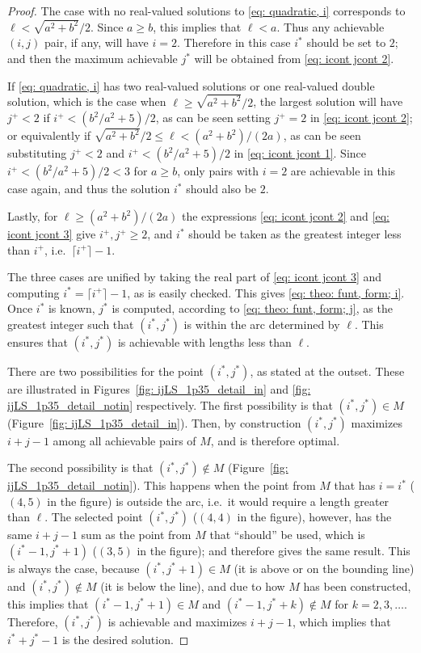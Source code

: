 \documentclass[12pt, a4paper]{article}
\newcommand{\len}{\ell} %
\newcommand{\isolr}{i^+}
\newcommand{\jsolr}{j^+}
\newcommand{\isoli}{i^\ast}
\newcommand{\jsoli}{j^\ast}
\newcommand{\mss}{M}
\begin{document}
\begin{proof}
The case with no real-valued solutions to \eqref{eq: quadratic, i} corresponds to $\len < \sqrt{a^2+b^2}/2$. Since $a \geq b$, this implies that $\len < a$. Thus any achievable $(i,j)$ pair, if any, will have $i=2$. Therefore in this case $\isoli$ should be set to $2$; and then the maximum achievable $\jsoli$ will be obtained from \eqref{eq: icont jcont 2}.

If \eqref{eq: quadratic, i} has two real-valued solutions or one real-valued double solution, which is the case when $\len \geq \sqrt{a^2+b^2}/2$, the largest solution will have $\jsolr < 2$ if $\isolr < (b^2/a^2+5)/2$, as can be seen setting $\jsolr=2$ in \eqref{eq: icont jcont 2}; or equivalently if $\sqrt{a^2+b^2}/2 \leq \len < (a^2+b^2) / (2a)$, as can be seen substituting $\jsolr < 2$ and $\isolr < (b^2/a^2+5)/2$ in \eqref{eq: icont jcont 1}. Since $\isolr < (b^2/a^2+5)/2 < 3$ for $a \geq b$, only pairs with $i=2$ are achievable in this case again, and thus the solution $\isoli$ should also be $2$.

Lastly, for $\len \geq (a^2+b^2) / (2a)$ the expressions \eqref{eq: icont jcont 2} and \eqref{eq: icont jcont 3} give $\isolr, \jsolr \geq 2$, and $\isoli$ should be taken as the greatest integer less than $\isolr$, i.e.~$\lceil \isolr \rceil-1$.
 
The three cases are unified by taking the real part of \eqref{eq: icont jcont 3} and computing $\isoli = \lceil \isolr \rceil-1$, as is easily checked. This gives \eqref{eq: theo: funt, form; i}. Once $\isoli$ is known, $\jsoli$ is computed, according to \eqref{eq: theo: funt, form; j}, as the greatest integer such that $(\isoli,\jsoli)$ is within the arc determined by $\len$. This ensures that $(\isoli,\jsoli)$ is achievable with lengths less than $\len$.

There are two possibilities for the point $(\isoli,\jsoli)$, as stated at the outset. These are illustrated in Figures~\ref{fig: ijLS_1p35_detail_in} and \ref{fig: ijLS_1p35_detail_notin} respectively. The first possibility is that $(\isoli,\jsoli) \in \mss$ (Figure~\ref{fig: ijLS_1p35_detail_in}). Then, by construction  $(\isoli,\jsoli)$ maximizes $i+j-1$ among all achievable pairs of $\mss$, and is therefore optimal.

The second possibility is that $(\isoli,\jsoli) \notin \mss$ (Figure~\ref{fig: ijLS_1p35_detail_notin}). This happens when the point from $\mss$ that has $i = \isoli$ ($(4,5)$ in the figure) is outside the arc, i.e.~it would require a length greater than $\len$. The selected point  $(\isoli,\jsoli)$ ($(4,4)$ in the figure), however, has the same $i+j-1$ sum as the point from $\mss$ that ``should'' be used, which is $(\isoli-1,\jsoli+1)$ ($(3,5)$ in the figure); and therefore gives the same result. This is always the case, because  $(\isoli,\jsoli+1) \in \mss$ (it is above or on the bounding line) and $(\isoli,\jsoli) \notin \mss$ (it is below the line), and due to how $\mss$ has been constructed, this implies that $(\isoli-1,\jsoli+1) \in \mss$ and $(\isoli-1,\jsoli+k) \notin \mss$ for $k =2, 3, \ldots$.  Therefore, $(\isoli,\jsoli)$ is achievable and maximizes $i+j-1$, which implies that $\isoli+\jsoli-1$ is the desired solution.


\end{proof}
\end{document}
